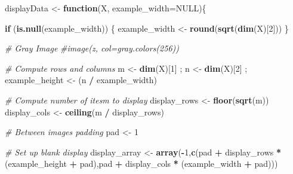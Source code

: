 \documentclass[
]{book}
\newenvironment{Shaded}{\begin{snugshade}}{\end{snugshade}}
\newcommand{\CommentTok}[1]{\textcolor[rgb]{0.56,0.35,0.01}{\textit{#1}}}
\newcommand{\ControlFlowTok}[1]{\textcolor[rgb]{0.13,0.29,0.53}{\textbf{#1}}}
\newcommand{\DataTypeTok}[1]{\textcolor[rgb]{0.13,0.29,0.53}{#1}}
\newcommand{\DecValTok}[1]{\textcolor[rgb]{0.00,0.00,0.81}{#1}}
\newcommand{\KeywordTok}[1]{\textcolor[rgb]{0.13,0.29,0.53}{\textbf{#1}}}
\newcommand{\NormalTok}[1]{#1}
\newcommand{\OperatorTok}[1]{\textcolor[rgb]{0.81,0.36,0.00}{\textbf{#1}}}
\newcommand{\OtherTok}[1]{\textcolor[rgb]{0.56,0.35,0.01}{#1}}
\newcommand{\StringTok}[1]{\textcolor[rgb]{0.31,0.60,0.02}{#1}}
\begin{document}
\begin{Shaded}
\begin{Highlighting}[]
\NormalTok{displayData <-}\StringTok{ }\ControlFlowTok{function}\NormalTok{(X, }\DataTypeTok{example_width=}\OtherTok{NULL}\NormalTok{)\{}

        \ControlFlowTok{if}\NormalTok{ (}\KeywordTok{is.null}\NormalTok{(example_width)) \{}
\NormalTok{                example_width <-}\StringTok{ }\KeywordTok{round}\NormalTok{(}\KeywordTok{sqrt}\NormalTok{(}\KeywordTok{dim}\NormalTok{(X)[}\DecValTok{2}\NormalTok{]))}
\NormalTok{        \}}
        
        \CommentTok{# Gray Image}
        \CommentTok{#image(z, col=gray.colors(256))}
        
        \CommentTok{# Compute rows and columns }
\NormalTok{        m <-}\StringTok{ }\KeywordTok{dim}\NormalTok{(X)[}\DecValTok{1}\NormalTok{] ; n <-}\StringTok{ }\KeywordTok{dim}\NormalTok{(X)[}\DecValTok{2}\NormalTok{] ; example_height <-}\StringTok{ }\NormalTok{(n }\OperatorTok{/}\StringTok{ }\NormalTok{example_width)}
        
        \CommentTok{# Compute number of itesm to display}
\NormalTok{        display_rows <-}\StringTok{ }\KeywordTok{floor}\NormalTok{(}\KeywordTok{sqrt}\NormalTok{(m))}
\NormalTok{        display_cols <-}\StringTok{ }\KeywordTok{ceiling}\NormalTok{(m }\OperatorTok{/}\StringTok{ }\NormalTok{display_rows)}
        
        \CommentTok{# Between images padding}
\NormalTok{        pad <-}\StringTok{ }\DecValTok{1}

        \CommentTok{# Set up blank display}
\NormalTok{        display_array <-}\StringTok{ }\KeywordTok{array}\NormalTok{(}\OperatorTok{-}\DecValTok{1}\NormalTok{,}\KeywordTok{c}\NormalTok{(pad }\OperatorTok{+}\StringTok{ }\NormalTok{display_rows }\OperatorTok{*}\StringTok{ }\NormalTok{(example_height }\OperatorTok{+}\StringTok{ }\NormalTok{pad),pad }\OperatorTok{+}\StringTok{ }\NormalTok{display_cols }\OperatorTok{*}\StringTok{ }\NormalTok{(example_width }\OperatorTok{+}\StringTok{ }\NormalTok{pad)))}
        

\end{Highlighting}
\end{Shaded}
\end{document}
